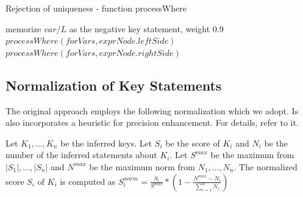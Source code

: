 \begin{algorithm}
\caption{Rejection of uniqueness - function processWhere}
\label{ALG_rejection_of_uniqueness_function_process_where}
\begin{algorithmic}[1]

                \STATE memorize $var/L$ as the negative key statement, weight 0.9
            \ENDIF
        \ENDFOR
        \STATE $processWhere(forVars, exprNode.leftSide)$
        \STATE $processWhere(forVars, exprNode.rightSide)$
    \ENDIF
\ENDIF
\end{algorithmic}
\end{algorithm}

\subsection{Normalization of Key Statements}
The original approach \cite{Necasky:2009:DXK:1529282.1529414} employs the following normalization which we adopt. Is also incorporates a heuristic for precision enhancement. For details, refer to it.

Let $K_1, \dots, K_n$ be the inferred keys. Let $S_i$ be the score of $K_i$ and $N_i$ be the number of the inferred statements about $K_i$. Let $S^{max}$ be the maximum from $|S_1|, \dots , |S_n|$ and $N^{max}$ be the maximum norm
from $N_1, \dots , N_n$. The normalized score $S_i$ of $K_i$ is computed as $S^{norm}_i = \frac{S_i}{S^{max}} * (1 - \frac{N^{max} - N_i}{\sum_{i=1}^{n}N_i})$
